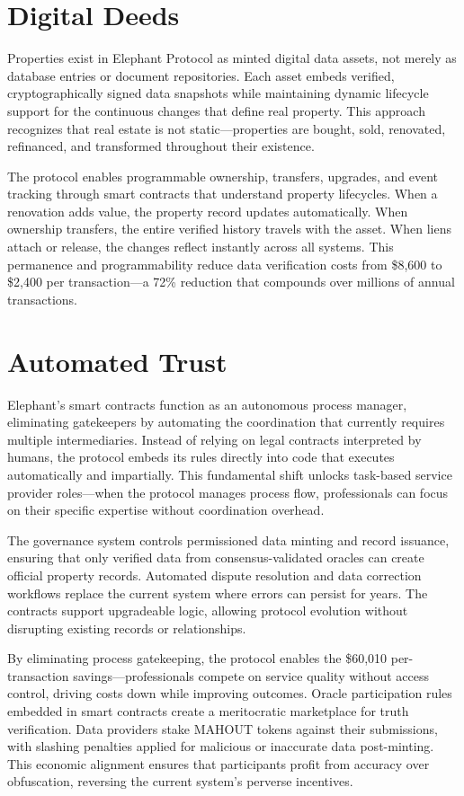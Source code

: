 \section{Digital Deeds}

Properties exist in Elephant Protocol as minted digital data assets, not merely as database entries or document repositories. Each asset embeds verified, cryptographically signed data snapshots while maintaining dynamic lifecycle support for the continuous changes that define real property. This approach recognizes that real estate is not static---properties are bought, sold, renovated, refinanced, and transformed throughout their existence.

The protocol enables programmable ownership, transfers, upgrades, and event tracking through smart contracts that understand property lifecycles. When a renovation adds value, the property record updates automatically. When ownership transfers, the entire verified history travels with the asset. When liens attach or release, the changes reflect instantly across all systems. This permanence and programmability reduce data verification costs from \$8,600 to \$2,400 per transaction---a 72\% reduction that compounds over millions of annual transactions.

\section{Automated Trust}

Elephant's smart contracts function as an autonomous process manager, eliminating gatekeepers by automating the coordination that currently requires multiple intermediaries. Instead of relying on legal contracts interpreted by humans, the protocol embeds its rules directly into code that executes automatically and impartially. This fundamental shift unlocks task-based service provider roles---when the protocol manages process flow, professionals can focus on their specific expertise without coordination overhead.

The governance system controls permissioned data minting and record issuance, ensuring that only verified data from consensus-validated oracles can create official property records. Automated dispute resolution and data correction workflows replace the current system where errors can persist for years. The contracts support upgradeable logic, allowing protocol evolution without disrupting existing records or relationships.

By eliminating process gatekeeping, the protocol enables the \$60,010 per-transaction savings---professionals compete on service quality without access control, driving costs down while improving outcomes. Oracle participation rules embedded in smart contracts create a meritocratic marketplace for truth verification. Data providers stake MAHOUT tokens against their submissions, with slashing penalties applied for malicious or inaccurate data post-minting. This economic alignment ensures that participants profit from accuracy over obfuscation, reversing the current system's perverse incentives.

